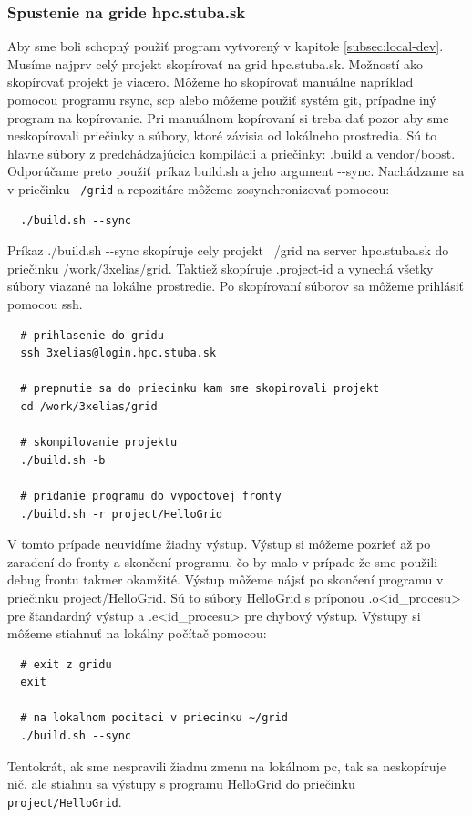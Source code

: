 \subsubsection{Spustenie na gride hpc.stuba.sk}
Aby sme boli schopný použiť program vytvorený v kapitole \ref{subsec:local-dev}. Musíme najprv celý projekt skopírovať na grid hpc.stuba.sk.
Možností ako skopírovať projekt je viacero. Môžeme ho skopírovať manuálne napríklad pomocou programu rsync, scp
alebo môžeme použiť systém git, prípadne iný program na kopírovanie.
Pri manuálnom kopírovaní si treba dať pozor aby sme neskopírovali priečinky a súbory, ktoré závisia od lokálneho prostredia.
Sú to hlavne súbory z predchádzajúcich kompilácii a priečinky: .build a vendor/boost. Odporúčame preto použiť príkaz build.sh a jeho argument -{}-sync.
Nachádzame sa v priečinku \texttt{~/grid} a repozitáre môžeme zosynchronizovať pomocou: 
\begin{lstlisting}
  ./build.sh --sync
\end{lstlisting}
Príkaz ./build.sh -{}-sync skopíruje cely projekt ~/grid na server hpc.stuba.sk do priečinku /work/3xelias/grid.
Taktiež skopíruje .project-id a vynechá všetky súbory viazané na lokálne prostredie.
Po skopírovaní súborov sa môžeme prihlásiť pomocou ssh.
\begin{lstlisting}
  # prihlasenie do gridu
  ssh 3xelias@login.hpc.stuba.sk

  # prepnutie sa do priecinku kam sme skopirovali projekt
  cd /work/3xelias/grid

  # skompilovanie projektu
  ./build.sh -b

  # pridanie programu do vypoctovej fronty
  ./build.sh -r project/HelloGrid
\end{lstlisting}
V tomto prípade neuvidíme žiadny výstup. Výstup si môžeme pozrieť až po zaradení do fronty a skončení programu, čo by malo v prípade že sme použili
debug frontu takmer okamžité. Výstup môžeme nájsť po skončení programu v priečinku project/HelloGrid. 
Sú to súbory HelloGrid s príponou .o<id\_procesu> pre štandardný výstup a .e<id\_procesu> pre chybový výstup.
Výstupy si môžeme stiahnuť na lokálny počítač pomocou:
\begin{lstlisting}
  # exit z gridu
  exit
  
  # na lokalnom pocitaci v priecinku ~/grid
  ./build.sh --sync
\end{lstlisting}
Tentokrát, ak sme nespravili žiadnu zmenu na lokálnom pc, tak sa neskopíruje nič,
ale stiahnu sa výstupy s programu HelloGrid do priečinku \texttt{project/HelloGrid}.

